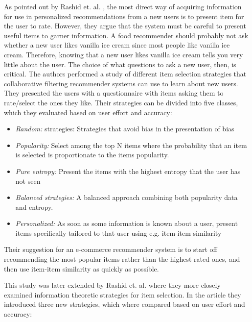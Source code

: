  
As pointed out by Rashid et. al. \cite{Rashid2002}, the most direct way of
acquiring information for use in personalized recommendations from a new users
is to present item for the user to rate. However, they argue that the system
must be careful to present useful items to garner information. A food
recommender should probably not ask whether a new user likes vanilla ice cream
since most people like vanilla ice cream. Therefore, knowing that a new user
likes vanilla ice cream tells you very little about the user. The choice of
what questions to ask a new user, then, is critical. The authors performed a
study of different item selection strategies that collaborative filtering
recommender systems can use to learn about new users. They presented the users
with a questionnaire with items asking them to rate/select the ones they like.
Their strategies can be divided into five classes, which they evaluated based on user effort and accuracy:

\begin{itemize}
\item \emph{Random:} strategies: Strategies that avoid bias in the presentation
of bias
\item \emph{Popularity:} Select among the top N items where the probability
that an item is selected is proportionate to the items popularity.
\item \emph{Pure entropy:} Present the items with the highest entropy that the
user has not seen
\item \emph{Balanced strategies:} A balanced approach combining both popularity
data and entropy.
\item \emph{Personalized:} As soon as some information is known about a user,
present items specifically tailored to that user using e.g. item-item
similarity
\end{itemize}

Their suggestion for an e-commerce recommender system is to start off recommending the most popular
items rather than the highest rated ones, and then use item-item similarity as
quickly as possible.


This study was later extended by Rashid et. al. \cite{Rashid2008} where they
more closely examined information theoretic strategies for item selection. In the article they introduced three new strategies, which where compared based on user effort and accuracy:

